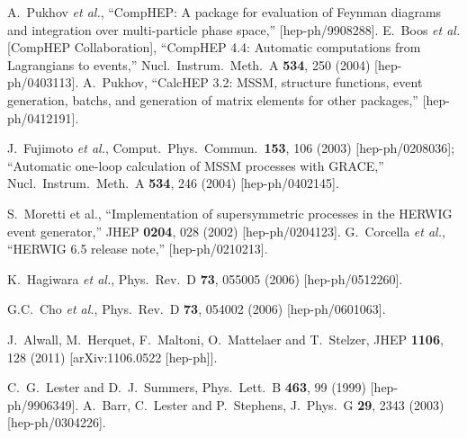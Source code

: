 \documentclass[11pt]{article}
\begin{document}
\begin{thebibliography}{999}
A.~Pukhov {\it et al.},
  ``CompHEP: A package for evaluation of Feynman diagrams and integration  over
  multi-particle phase space,''
  [hep-ph/9908288].
E.~Boos {\it et al.}  [CompHEP Collaboration],
  ``CompHEP 4.4: Automatic computations from Lagrangians to events,''
  Nucl.\ Instrum.\ Meth.\ A {\bf 534}, 250 (2004)
  [hep-ph/0403113].
A.~Pukhov,
  ``CalcHEP 3.2: MSSM, structure functions, event generation, batchs, and
  generation of matrix elements for other packages,''
  [hep-ph/0412191].

J.~Fujimoto {\em et al.}, 
  Comput.\ Phys.\ Commun.\  {\bf 153}, 106 (2003)
  [hep-ph/0208036];
  ``Automatic one-loop calculation of MSSM processes with GRACE,''
  Nucl.\ Instrum.\ Meth.\ A {\bf 534}, 246 (2004)
  [hep-ph/0402145].

S.~Moretti et al.,
  ``Implementation of supersymmetric processes in the HERWIG event
  generator,''
  JHEP {\bf 0204}, 028 (2002)
  [hep-ph/0204123].
G.~Corcella {\it et al.},
  ``HERWIG 6.5 release note,''
  [hep-ph/0210213].

K.~Hagiwara {\it et al.},
  Phys.\ Rev.\ D {\bf 73}, 055005 (2006)
  [hep-ph/0512260].

G.C.~Cho {\it et al.},
  Phys.\ Rev.\ D {\bf 73}, 054002 (2006)
  [hep-ph/0601063].

  J.~Alwall, M.~Herquet, F.~Maltoni, O.~Mattelaer and T.~Stelzer,
  JHEP {\bf 1106}, 128 (2011)
  [arXiv:1106.0522 [hep-ph]].

C.~G.~Lester and D.~J.~Summers,
  Phys.\ Lett.\ B {\bf 463}, 99 (1999)
  [hep-ph/9906349].
A.~Barr, C.~Lester and P.~Stephens,
  J.\ Phys.\ G {\bf 29}, 2343 (2003)
  [hep-ph/0304226].


\end{thebibliography}
\end{document}
